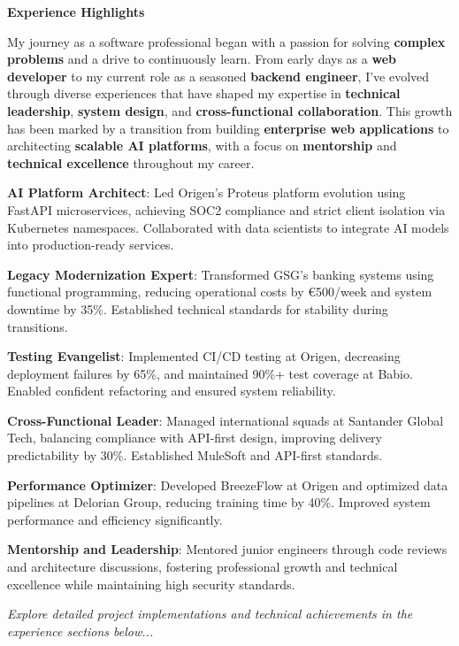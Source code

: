 \documentclass[a4paper,10pt]{article}
\begin{document}
	\vspace{0.5cm}
	\noindent
	\begin{minipage}{\textwidth}
		{\large\bfseries\color{darkblue}\selectfont Experience Highlights}
		\vspace{0.3cm}

		My journey as a software professional began with a passion for solving \textbf{complex problems} and a drive to continuously learn. From early days as a \textbf{web developer} to my current role as a seasoned \textbf{backend engineer}, I've evolved through diverse experiences that have shaped my expertise in \textbf{technical leadership}, \textbf{system design}, and \textbf{cross-functional collaboration}. This growth has been marked by a transition from building \textbf{enterprise web applications} to architecting \textbf{scalable AI platforms}, with a focus on \textbf{mentorship} and \textbf{technical excellence} throughout my career.


		\vspace{0.2cm}
		\noindent\textbf{AI Platform Architect}: Led Origen's Proteus platform evolution using FastAPI microservices, achieving SOC2 compliance and strict client isolation via Kubernetes namespaces. Collaborated with data scientists to integrate AI models into production-ready services.

		\vspace{0.2cm}
		\noindent\textbf{Legacy Modernization Expert}: Transformed GSG's banking systems using functional programming, reducing operational costs by €500/week and system downtime by 35\%. Established technical standards for stability during transitions.

		\vspace{0.2cm}
		\noindent\textbf{Testing Evangelist}: Implemented CI/CD testing at Origen, decreasing deployment failures by 65\%, and maintained 90\%+ test coverage at Babio. Enabled confident refactoring and ensured system reliability.

		\vspace{0.2cm}
		\noindent\textbf{Cross-Functional Leader}: Managed international squads at Santander Global Tech, balancing compliance with API-first design, improving delivery predictability by 30\%. Established MuleSoft and API-first standards.

		\vspace{0.2cm}
		\noindent\textbf{Performance Optimizer}: Developed BreezeFlow at Origen and optimized data pipelines at Delorian Group, reducing training time by 40\%. Improved system performance and efficiency significantly.

		\vspace{0.2cm}
		\noindent\textbf{Mentorship and Leadership}: Mentored junior engineers through code reviews and architecture discussions, fostering professional growth and technical excellence while maintaining high security standards.

		\vspace{0.4cm}
		{\raggedleft\itshape \textit{Explore detailed project implementations and technical achievements in the experience sections below...}}
	\end{minipage}
\end{document}
